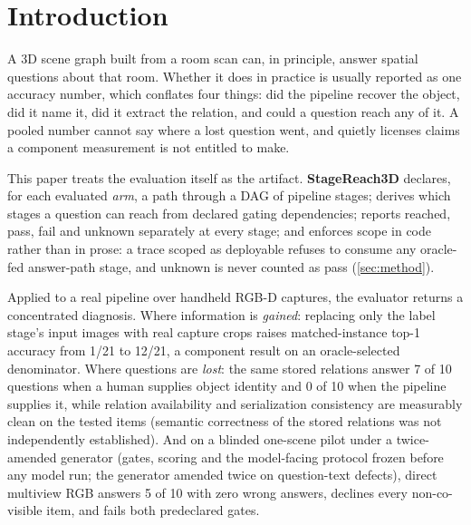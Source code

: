 \section{Introduction}

A 3D scene graph built from a room scan can, in principle, answer spatial questions
about that room. Whether it does in practice is usually reported as one accuracy
number, which conflates four things: did the pipeline recover the object, did it name
it, did it extract the relation, and could a question reach any of it. A pooled number
cannot say where a lost question went, and quietly licenses claims a component
measurement is not entitled to make.

This paper treats the evaluation itself as the artifact. \textbf{StageReach3D} declares,
for each evaluated \emph{arm}, a path through a DAG of pipeline stages; derives which
stages a question can reach from declared gating dependencies; reports reached, pass,
fail and unknown separately at every stage; and enforces scope in code rather than in
prose: a trace scoped as deployable refuses to consume any oracle-fed answer-path
stage, and
unknown is never counted as pass (\cref{sec:method}).

Applied to a real pipeline over handheld RGB-D captures, the evaluator returns a
concentrated diagnosis. Where information is \emph{gained}: replacing only the label
stage's input images with real capture crops raises matched-instance top-1 accuracy from
1/21 to 12/21, a component result on an oracle-selected denominator. Where questions are
\emph{lost}: the same stored relations answer 7 of 10 questions when a human supplies
object identity and 0 of 10 when the pipeline supplies it, while relation availability
and serialization consistency are measurably clean on the tested items (semantic
correctness of the stored relations was not independently established). And on a blinded
one-scene pilot under a twice-amended generator (gates, scoring and the model-facing
protocol frozen before any model run; the generator amended twice on question-text
defects), direct multiview RGB answers 5 of 10 with zero wrong answers,
declines every non-co-visible item, and fails both predeclared gates.

